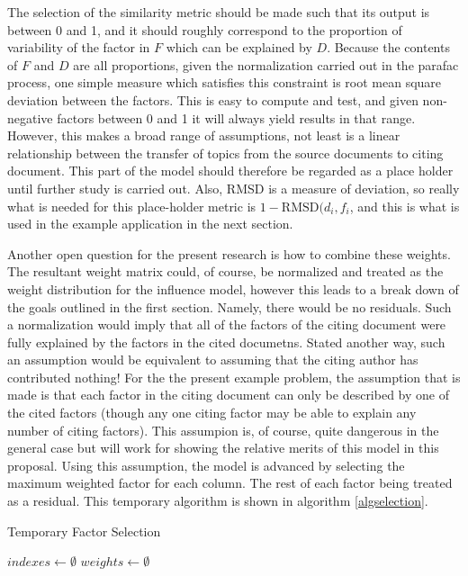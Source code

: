 \documentclass{article}
\begin{document}
The selection of the similarity metric should be made such that its
output is between 0 and 1, and it should roughly correspond to the
proportion of variability of the factor in $F$ which can be explained
by $D$.  Because the contents of $F$ and $D$ are all proportions,
given the normalization carried out in the parafac process, one simple
measure which satisfies this constraint is root mean square deviation
between the factors.  This is easy to compute and test, and given
non-negative factors between 0 and 1 it will always yield results in
that range.  However, this makes a broad range of assumptions, not
least is a linear relationship between the transfer of topics from the
source documents to citing document.  This part of the model should
therefore be regarded as a place holder until further study is carried
out.  Also, RMSD is a measure of deviation, so really what is needed
for this place-holder metric is $1-\mathrm{RMSD}(d_i, f_i$, and this
is what is used in the example application in the next section.

Another open question for the present research is how to combine these
weights.  The resultant weight matrix could, of course, be normalized
and treated as the weight distribution for the influence model,
however this leads to a break down of the goals outlined in the first
section.  Namely, there would be no residuals.  Such a normalization
would imply that all of the factors of the citing document were fully
explained by the factors in the cited documetns.  Stated another way,
such an assumption would be equivalent to assuming that the citing
author has contributed nothing!  For the the present example problem,
the assumption that is made is that each factor in the citing document
can only be described by one of the cited factors (though any one
citing factor may be able to explain any number of citing factors).
This assumpion is, of course, quite dangerous in the general case but
will work for showing the relative merits of this model in this
proposal.  Using this assumption, the model is advanced by selecting
the maximum weighted factor for each column.  The rest of each factor
being treated as a residual.  This temporary algorithm is shown in
algorithm \ref{algselection}.

\begin{algorithm}
    \caption{Temporary Factor Selection}
    \label{algselection}
    $indexes \leftarrow \emptyset$\;
    $weights \leftarrow \emptyset$\;
\end{algorithm}
\end{document}

